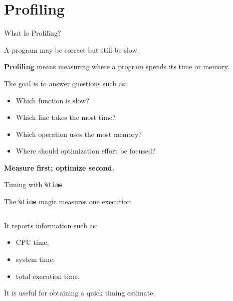 \documentclass[aspectratio=43]{beamer}
\begin{document}
\section{Profiling}

\begin{frame}{What Is Profiling?}

A program may be correct but still be slow.

\vspace{0.3cm}

\textbf{Profiling} means measuring where a program spends its time or memory.

\vspace{0.3cm}

The goal is to answer questions such as:

\begin{itemize}
  \item Which function is slow?
  \item Which line takes the most time?
  \item Which operation uses the most memory?
  \item Where should optimization effort be focused?
\end{itemize}

\vspace{0.3cm}

\textbf{Measure first; optimize second.}

\end{frame}

\begin{frame}[fragile]{Timing with \texttt{\%time}}

The \texttt{\%time} magic measures one execution.

\begin{lstlisting}[language=Python]
%time sum(range(1000000))
\end{lstlisting}

It reports information such as:

\begin{itemize}
  \item CPU time,
  \item system time,
  \item total execution time.
\end{itemize}

\vspace{0.3cm}

It is useful for obtaining a quick timing estimate.

\end{frame}
\end{document}
